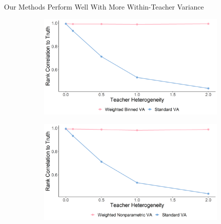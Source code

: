 \documentclass[t,aspectratio=169,11pt]{beamer}
\begin{document}

\begin{frame}{Our Methods Perform Well With More Within-Teacher Variance}
\vfill
\begin{figure}
\centering
\begin{subfigure}{.5\textwidth}
  \centering
  \includegraphics[width=\linewidth]{slides/CIERS_Figures/stress_bin_max_diff.png}
\end{subfigure}%
\begin{subfigure}{.5\textwidth}
  \centering
  \includegraphics[width=\linewidth]{slides/CIERS_Figures/stress_np_max_diff.png}
\end{subfigure}
\end{figure}

\end{frame}
\end{document}
